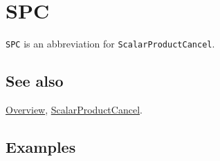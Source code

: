 \documentclass[../FeynCalcManual.tex]{subfiles}
\begin{document}
\hypertarget{spc}{
\section{SPC}\label{spc}}

\texttt{SPC} is an abbreviation for \texttt{ScalarProductCancel}.

\subsection{See also}

\hyperlink{toc}{Overview},
\hyperlink{scalarproductcancel}{ScalarProductCancel}.

\subsection{Examples}
\end{document}
